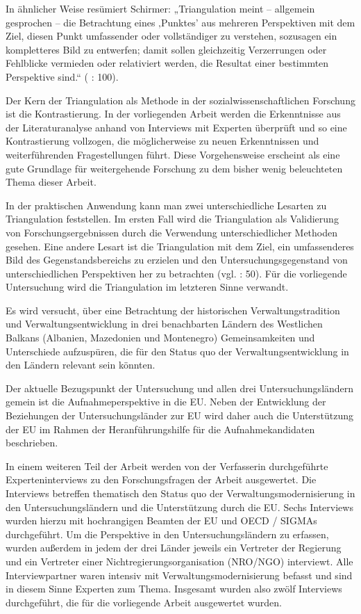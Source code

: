 In ähnlicher Weise resümiert Schirmer: „Triangulation meint – allgemein gesprochen – die Betrachtung eines ‚Punktes’ aus mehreren Perspektiven mit dem Ziel, diesen Punkt umfassender oder vollständiger zu verstehen, sozusagen ein kompletteres Bild zu entwerfen; damit sollen gleichzeitig Verzerrungen oder Fehlblicke vermieden oder relativiert werden, die Resultat einer bestimmten Perspektive sind.“ (\cite{schirmer} : 100). \par
Der Kern der Triangulation als Methode in der sozialwissenschaftlichen Forschung ist die Kontrastierung. In der vorliegenden Arbeit werden die Erkenntnisse aus der Literaturanalyse anhand von Interviews mit Experten überprüft und so eine Kontrastierung vollzogen, die möglicherweise zu neuen Erkenntnissen und weiterführenden Fragestellungen führt. Diese Vorgehensweise erscheint als eine gute Grundlage für weitergehende Forschung zu dem bisher wenig beleuchteten Thema dieser Arbeit.\par
In der praktischen Anwendung kann man zwei unterschiedliche Lesarten zu Triangulation feststellen. Im ersten Fall wird die Triangulation als Validierung von Forschungsergebnissen durch die Verwendung unterschiedlicher Methoden gesehen. Eine andere Lesart ist die Triangulation mit dem Ziel, ein umfassenderes Bild des Gegenstandsbereichs zu erzielen und den Untersuchungsgegenstand von unterschiedlichen Perspektiven her zu betrachten (vgl. \cite{kelle} : 50). Für die vorliegende Untersuchung wird die Triangulation im letzteren Sinne verwandt.\par
Es wird versucht, über eine Betrachtung der historischen Verwaltungstradition und Verwaltungsentwicklung in drei benachbarten Ländern des Westlichen Balkans (Albanien, Mazedonien und Montenegro) Gemeinsamkeiten und Unterschiede aufzuspüren, die für den Status quo der Verwaltungsentwicklung in den Ländern relevant sein könnten.\par
Der aktuelle Bezugspunkt der Untersuchung und allen drei Untersuchungsländern gemein ist die Aufnahmeperspektive in die EU. Neben der Entwicklung der Beziehungen der Untersuchungsländer zur EU wird daher auch die Unterstützung der EU im Rahmen der Heranführungshilfe für die Aufnahmekandidaten beschrieben.\par
In einem weiteren Teil der Arbeit werden von der Verfasserin durchgeführte Experteninterviews zu den Forschungsfragen der Arbeit ausgewertet. Die Interviews betreffen thematisch den Status quo der Verwaltungsmodernisierung in den Untersuchungsländern und die Unterstützung durch die EU. Sechs Interviews wurden hierzu mit hochrangigen Beamten der EU und OECD / SIGMAs durchgeführt. Um die Perspektive in den Untersuchungsländern zu erfassen, wurden außerdem in jedem der drei Länder jeweils ein Vertreter der Regierung und ein Vertreter einer Nichtregierungsorganisation (NRO/NGO) interviewt. Alle Interviewpartner waren intensiv mit Verwaltungsmodernisierung befasst und sind in diesem Sinne Experten zum Thema. Insgesamt wurden also zwölf Interviews durchgeführt, die für die vorliegende Arbeit ausgewertet wurden.\par
